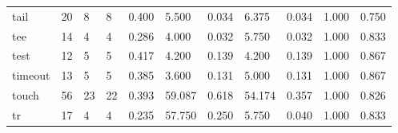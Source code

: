 \begin{longtable}{lp{1.2cm}p{1.2cm}p{1.2cm}p{1.2cm}p{1.2cm}p{1.2cm}p{1.2cm}p{1.2cm}p{1.2cm}p{1.2cm}}
tail      &                           20 &                  8 &                                 8 &                                      0.400 &                                  5.500 &                                        0.034 &                             6.375 &                                   0.034 &                              1.000 &                                              0.750 \\
tee       &                           14 &                  4 &                                 4 &                                      0.286 &                                  4.000 &                                        0.032 &                             5.750 &                                   0.032 &                              1.000 &                                              0.833 \\
test      &                           12 &                  5 &                                 5 &                                      0.417 &                                  4.200 &                                        0.139 &                             4.200 &                                   0.139 &                              1.000 &                                              0.867 \\
timeout   &                           13 &                  5 &                                 5 &                                      0.385 &                                  3.600 &                                        0.131 &                             5.000 &                                   0.131 &                              1.000 &                                              0.867 \\
touch     &                           56 &                 23 &                                22 &                                      0.393 &                                 59.087 &                                        0.618 &                            54.174 &                                   0.357 &                              1.000 &                                              0.826 \\
tr        &                           17 &                  4 &                                 4 &                                      0.235 &                                 57.750 &                                        0.250 &                             5.750 &                                   0.040 &                              1.000 &                                              0.833 \\

\end{longtable}
